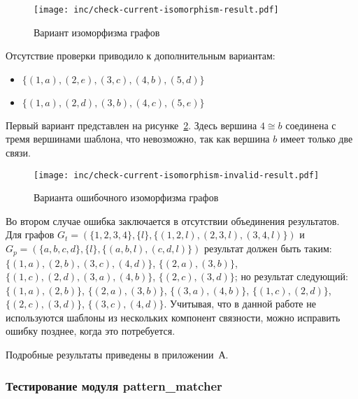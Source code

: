 \begin{figure}[!ht]
\centering
\texttt{[image: inc/check-current-isomorphism-result.pdf]}
\caption{Вариант изоморфизма графов}
\label{fig:check-current-isomorphism-result}
\end{figure}

Отсутствие проверки приводило к дополнительным вариантам:
\begin{itemize}
\item $\{ (1, a), (2, e), (3, c), (4, b), (5, d) \}$
\item $\{ (1, a), (2, d), (3, b), (4, c), (5, e) \}$
\end{itemize}
Первый вариант представлен на
рисунке~\ref{fig:check-current-isomorphism-invalid-result}.
Здесь вершина $4 \cong b$ соединена с тремя вершинами шаблона,
что невозможно, так как вершина $b$ имеет только две связи.

\begin{figure}[!ht]
\centering
\texttt{[image: inc/check-current-isomorphism-invalid-result.pdf]}
\caption{Варианта ошибочного изоморфизма графов}
\label{fig:check-current-isomorphism-invalid-result}
\end{figure}

Во втором случае ошибка заключается в отсутствии объединения результатов.
Для графов $G_t = (\{ 1, 2, 3, 4 \}, \{ l \}, \{ (1, 2, l), (2, 3, l), (3, 4, l) \})$
и $G_p = (\{ a, b, c, d \}, \{ l \}, \{ (a, b, l), (c, d, l) \})$
результат должен быть таким:
$\{ (1, a), (2, b), (3, c), (4, d) \}$,
$\{ (2, a), (3, b) \}$,
$\{ (1, c), (2, d), (3, a), (4, b) \}$,
$\{ (2, c), (3, d) \}$;
но результат следующий:
$\{ (1, a), (2, b) \}$,
$\{ (2, a), (3, b) \}$,
$\{ (3, a), (4, b) \}$,
$\{ (1, c), (2, d) \}$,
$\{ (2, c), (3, d) \}$,
$\{ (3, c), (4, d) \}$.
Учитывая, что в данной работе не используются шаблоны из нескольких компонент
связности, можно исправить ошибку позднее, когда это потребуется.

Подробные результаты приведены в приложении~А.

\subsubsection{Тестирование модуля pattern\_matcher}


